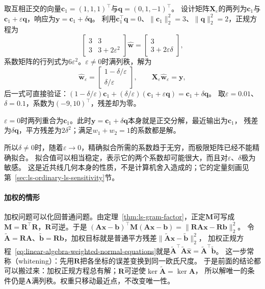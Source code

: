 \begin{example}
\label{ex:ls-nearly-collinear-design}
取互相正交的向量$\bm c_1=(1,1,1)^\top$与$\bm q=(0,1,-1)^\top$。
设计矩阵$\bm X_\varepsilon$的两列为$\bm c_1$与$\bm c_1+\varepsilon\bm q$，响应为$\bm y=\bm c_1+\delta\bm q$。
利用$\bm c_1^\top\bm q=0$、$\lVert\bm c_1\rVert_2^2=3$、$\lVert\bm q\rVert_2^2=2$，正规方程为
\[
 \begin{bmatrix}3&3\\3&3+2\varepsilon^2\end{bmatrix}\hat{\bm w}
 =\begin{bmatrix}3\\3+2\varepsilon\delta\end{bmatrix},
\]
系数矩阵的行列式为$6\varepsilon^2$。$\varepsilon\neq0$时满列秩，解为
\begin{equation}
 \hat{\bm w}_\varepsilon
 =\begin{bmatrix}1-\delta/\varepsilon\\\delta/\varepsilon\end{bmatrix},
 \qquad\bm X_\varepsilon\hat{\bm w}_\varepsilon=\bm y,
 \label{eq:linear-algebra-nearly-collinear-least-squares}
\end{equation}
后一式可直接验证：$(1-\delta/\varepsilon)\bm c_1+(\delta/\varepsilon)(\bm c_1+\varepsilon\bm q)=\bm c_1+\delta\bm q$。
取$\varepsilon=0.01$、$\delta=0.1$，系数为$(-9,10)^\top$，残差却为零。

$\varepsilon=0$时两列重合为$\bm c_1$。此时$\bm y=\bm c_1+\delta\bm q$本身就是正交分解，最近输出为$\bm c_1$，
残差为$\delta\bm q$，平方残差为$2\delta^2$；满足$w_1+w_2=1$的系数都是解。
\end{example}

所以$\delta\neq0$时，随着$\varepsilon\to0$，精确拟合所需的系数趋于无穷，而极限矩阵已经不能精确拟合。
拟合值可以相当稳定，表示它的两个系数却可能很大，而且对$\varepsilon$、$\delta$极为敏感。
这是近共线几何本身的性质，不是计算机舍入造成的；它的定量刻画见第~\ref{sec:ls-ordinary-ls-sensitivity}节。

\paragraph{加权的情形}

加权问题可以化回普通问题。由定理~\ref{thm:ls-gram-factor}，正定$\bm M$可写成
$\bm M=\bm R^\top\bm R$，$\bm R$可逆。于是
$(\bm A\bm x-\bm b)^\top\bm M(\bm A\bm x-\bm b)=\lVert\bm R\bm A\bm x-\bm R\bm b\rVert_2^2$。
令$\tilde{\bm A}=\bm R\bm A$、$\tilde{\bm b}=\bm R\bm b$，加权目标就是普通平方残差$\lVert\tilde{\bm A}\bm x-\tilde{\bm b}\rVert_2^2$，
加权正规方程~\eqref{eq:linear-algebra-weighted-normal-equations}就是$\tilde{\bm A}^\top\tilde{\bm A}\hat{\bm x}=\tilde{\bm A}^\top\tilde{\bm b}$。
这一步常称（whitening）：先用$\bm R$把各坐标的误差变换到同一欧氏尺度。
于是前面的结论都可以搬过来：加权正规方程总有解；$\bm R$可逆使$\ker\tilde{\bm A}=\ker\bm A$，
所以解唯一的条件仍是$\bm A$满列秩。权重只移动最近点，不改变唯一性。

